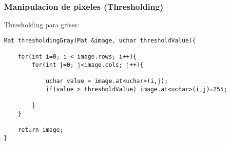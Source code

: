 \begin{frame}[fragile]
   \frametitle{Manipulacion de pixeles (Thresholding)}

   Thresholding para grises:

    \scriptsize

    \begin{lstlisting}
Mat thresholdingGray(Mat &image, uchar thresholdValue){

    for(int i=0; i < image.rows; i++){
        for(int j=0; j<image.cols; j++){

            uchar value = image.at<uchar>(i,j);
            if(value > thresholdValue) image.at<uchar>(i,j)=255;

        }
    }

    return image;
}

    \end{lstlisting}

\end{frame}
